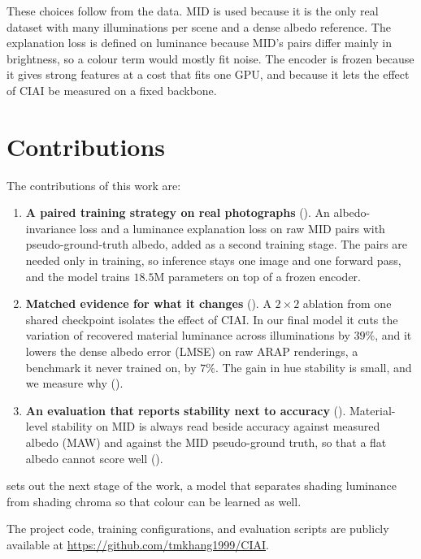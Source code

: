 These choices follow from the data. MID is used because it is the only real dataset with
many illuminations per scene and a dense albedo reference. The explanation loss is defined
on luminance because MID's pairs differ mainly in brightness, so a colour term would mostly fit
noise. The encoder is frozen because it gives strong features at
a cost that fits one GPU, and because it lets the effect of CIAI be measured on a fixed
backbone.


\section{Contributions}

The contributions of this work are:

\begin{enumerate}

  \item \textbf{A paired training strategy on real photographs} ().
  An albedo-invariance loss and a luminance explanation loss on raw MID pairs with
  pseudo-ground-truth albedo, added as a second training stage. The pairs are needed only in
  training, so inference stays one image and one forward pass, and the model trains $18.5$M
  parameters on top of a frozen encoder.

  \item \textbf{Matched evidence for what it changes} ().
  A $2 \times 2$ ablation from one shared checkpoint isolates the effect of CIAI. In our final
  model it cuts the variation of recovered material luminance across illuminations by $39\%$,
  and it lowers the dense albedo error (LMSE) on raw ARAP renderings, a benchmark it never
  trained on, by $7\%$. The gain in hue stability is small, and we measure why
  ().

  \item \textbf{An evaluation that reports stability next to accuracy} ().
  Material-level stability on MID is always read beside accuracy against measured albedo
  (MAW) and against the MID pseudo-ground truth, so that a flat albedo cannot score well
  ().

\end{enumerate}
 sets out the next stage of the work, a model that separates shading
luminance from shading chroma so that colour can be learned as well.

The project code, training configurations, and evaluation scripts are publicly available at
\url{https://github.com/tmkhang1999/CIAI}.

